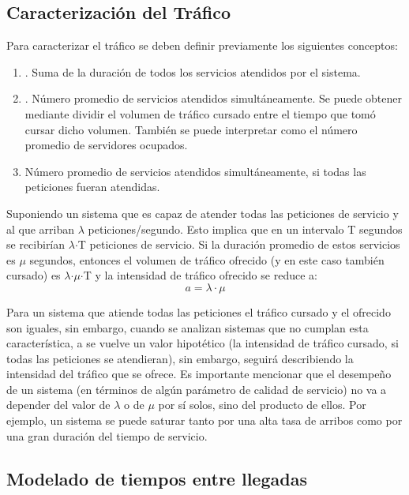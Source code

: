 \subsection{Caracterización del Tráfico}
Para caracterizar el tráfico se deben definir previamente los siguientes conceptos:
\begin{enumerate}
\item  {}. Suma de la duración de todos los servicios atendidos por el sistema.
\item  {}. Número promedio de servicios atendidos simultáneamente. Se puede obtener mediante dividir el volumen de tráfico cursado entre el tiempo que tomó cursar dicho volumen. También se puede interpretar como el número promedio de servidores ocupados.
\item  {} Número promedio de servicios atendidos simultáneamente, si todas las peticiones fueran atendidas.
\end{enumerate}

Suponiendo un sistema que es capaz de atender todas las peticiones de servicio y al que arriban $\lambda$ peticiones/segundo. Esto implica que en un intervalo T segundos se recibirían $\lambda$$\cdot$T peticiones de servicio. Si la duración promedio de estos servicios es $\mu$ segundos, entonces el volumen de tráfico ofrecido (y en este caso también cursado) es $\lambda$$\cdot$$\mu$$\cdot$T y la intensidad de tráfico ofrecido se reduce a:
\begin{equation}
    a=\lambda\cdot\mu
    \label{eqn:a}
\end{equation}

Para un sistema que atiende todas las peticiones el tráfico cursado y el ofrecido son iguales, sin embargo, cuando se analizan sistemas que no cumplan esta característica, a se vuelve un valor hipotético (la intensidad de tráfico cursado, si todas las peticiones se atendieran), sin embargo, seguirá describiendo la intensidad del tráfico que se ofrece. Es importante mencionar que el desempeño de un sistema (en términos de algún parámetro de calidad de servicio) no va a depender del valor de $\lambda$ o de $\mu$ por sí solos, sino del producto de ellos. Por ejemplo, un sistema se puede saturar tanto por una alta tasa de arribos como por una gran duración del tiempo de servicio.\newline

\subsection{Modelado de tiempos entre llegadas}

